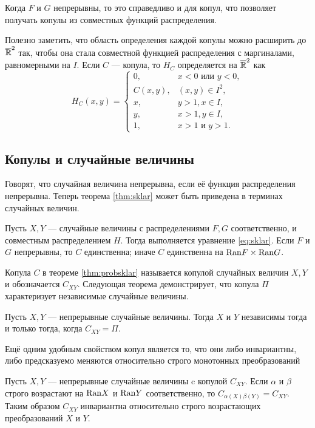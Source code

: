 Когда $F$ и $G$ непрерывны, то это справедливо и для копул, что позволяет получать копулы из совместных функций распределения.

Полезно заметить, что область определения каждой копулы можно расширить до $\overline{\mathbb{R}}^2$ так, чтобы она стала совместной функцией распределения с маргиналами, равномерными на $I$. Если $C$ --- копула, то $H_C$ определяется на $\overline{\mathbb{R}}^2$ как
\[
H_C(x, y) =
\begin{cases}
0, &x < 0 \text{ или } y < 0, \\
C(x, y), &(x, y) \in I^2, \\
x, &y > 1, x \in I, \\
y, &x > 1, y \in I, \\
1, &x > 1 \text{ и } y > 1.
\end{cases}
\]

\subsection*{Копулы и случайные величины}

Говорят, что случайная величина непрерывна, если её функция распределения непрерывна. Теперь теорема \ref{thm:sklar} может быть приведена в терминах случайных величин.

\begin{theorem}\label{thm:probsklar}
	Пусть $X, Y$ --- случайные величины с распределениями $F, G$ соответственно, и совместным распределением $H$. Тогда выполняется уравнение \eqref{eq:sklar}.
Если $F$ и $G$ непрерывны, то $C$ единственна; иначе $C$ единственна на $\mathrm{Ran}{F} \times \mathrm{Ran}{G}$.
\end{theorem}

Копула $C$ в теореме \ref{thm:probsklar} называется копулой случайных величин $X, Y$ и обозначается $C_{XY}$. Следующая теорема демонстрирует, что копула $\Pi$ характеризует независимые случайные величины.

\begin{theorem}
	Пусть $X, Y$ --- непрерывные случайные величины. Тогда $X$ и $Y$ независимы тогда и только тогда, когда $C_{XY} = \Pi$.
\end{theorem}

Ещё одним удобным свойством копул является то, что они либо инвариантны, либо предсказуемо меняются относительно строго монотонных преобразований

\begin{theorem}\label{thm:copula_invariant}
	Пусть $X, Y$ --- непрерывные случайные величины c копулой $C_{XY}$. Если $\alpha$ и $\beta$ строго возрастают на $\mathrm{Ran}{X}$ и $\mathrm{Ran}{Y}$ соответственно, то $C_{\alpha(X)\beta(Y)} = C_{XY}$. Таким образом $C_{XY}$ инвариантна относительно строго возрастающих преобразований $X$ и $Y$.
\end{theorem}

